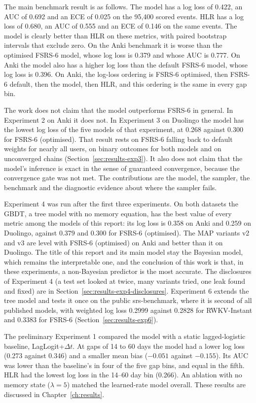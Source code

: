 The main benchmark result is as follows. The model has a log loss of 0.422, an AUC of 0.692 and an
ECE of 0.025 on the 95,400 scored events. HLR has a log loss of 0.680, an AUC of 0.555 and an ECE of
0.146 on the same events. The model is clearly better than HLR on these metrics, with paired
bootstrap intervals that exclude zero. On the Anki benchmark it is worse than the optimised FSRS-6 model, whose log loss
is 0.379 and whose AUC is 0.777. On Anki the model also has a higher log loss than the default FSRS-6 model,
whose log loss is 0.396. On Anki, the log-loss ordering is FSRS-6 optimised, then FSRS-6 default, then the model, then HLR, and this
ordering is the same in every gap bin.

The work does not claim that the model outperforms FSRS-6 in general. In Experiment 2 on Anki it does not. In Experiment 3 on Duolingo the model has the lowest log loss of the five models of that experiment, at 0.268 against 0.300 for FSRS-6 (optimised). That result rests on FSRS-6 falling back to default weights for nearly all users, on binary outcomes for both models and on unconverged chains (Section~\ref{sec:results-exp3}). It also
does not claim that the model's inference is exact in the sense of guaranteed convergence, because the
convergence gate was not met. The contributions are the model, the sampler, the benchmark and the
diagnostic evidence about where the sampler fails.

Experiment 4 was run after the first three experiments. On both datasets the GBDT, a tree model with no memory equation, has the best value of every metric among the models of this report: its log loss is 0.358 on Anki and 0.259 on Duolingo, against 0.379 and 0.300 for FSRS-6 (optimised). The MAP variants v2 and v3 are level with FSRS-6 (optimised) on Anki and better than it on Duolingo. The title of this report and its main model stay the Bayesian model, which remains the interpretable one, and the conclusion of this work is that, in these experiments, a non-Bayesian predictor is the most accurate. The disclosures of Experiment 4 (a test set looked at twice, many variants tried, one leak found and fixed) are in Section~\ref{sec:results-exp4-disclosures}. Experiment 6 extends the tree model and tests it once on the public srs-benchmark, where it is second of all published models, with weighted log loss 0.2999 against 0.2828 for RWKV-Instant and 0.3383 for FSRS-6 (Section~\ref{sec:results-exp6}).

The preliminary Experiment 1 compared the model with a static lagged-logistic baseline, LagLogit+$\Delta t$.
At gaps of 14 to 60 days the model had a lower log loss (0.273 against 0.346) and a smaller mean bias
($-0.051$ against $-0.155$). Its AUC was lower than the baseline's in four of the five gap bins, and
equal in the fifth. HLR had the lowest log loss in the 14--60 day bin (0.266). An ablation with no
memory state ($\lambda = 5$) matched the learned-rate model overall. These results are discussed in
Chapter~\ref{ch:results}.

